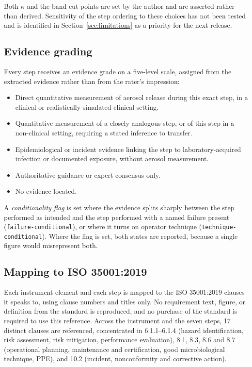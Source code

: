 Both $\kappa$ and the band cut points are set by the author and are asserted rather than
derived. Sensitivity of the step ordering to these choices has not been tested and is
identified in Section~\ref{sec:limitations} as a priority for the next release.

\subsection{Evidence grading}

Every step receives an evidence grade on a five-level scale, assigned from the extracted
evidence rather than from the rater's impression:

\begin{itemize}
\item[\textbf{E1}] Direct quantitative measurement of aerosol release during this exact
      step, in a clinical or realistically simulated clinical setting.
\item[\textbf{E2}] Quantitative measurement of a closely analogous step, or of this step
      in a non-clinical setting, requiring a stated inference to transfer.
\item[\textbf{E3}] Epidemiological or incident evidence linking the step to
      laboratory-acquired infection or documented exposure, without aerosol measurement.
\item[\textbf{E4}] Authoritative guidance or expert consensus only.
\item[\textbf{E5}] No evidence located.
\end{itemize}

A \emph{conditionality flag} is set where the evidence splits sharply between the step
performed as intended and the step performed with a named failure present
(\texttt{failure-conditional}), or where it turns on operator technique
(\texttt{technique-conditional}). Where the flag is set, both states are reported, because
a single figure would misrepresent both.

\subsection{Mapping to ISO 35001:2019}

Each instrument element and each step is mapped to the ISO 35001:2019 clauses it speaks
to, using clause numbers and titles only. No requirement text, figure, or definition from
the standard is reproduced, and no purchase of the standard is required to use this
reference. Across the instrument and the seven steps, 17 distinct clauses are referenced,
concentrated in 6.1.1--6.1.4 (hazard identification, risk assessment, risk mitigation,
performance evaluation), 8.1, 8.3, 8.6 and 8.7 (operational planning, maintenance and
certification, good microbiological technique, PPE), and 10.2 (incident, nonconformity and
corrective action).

